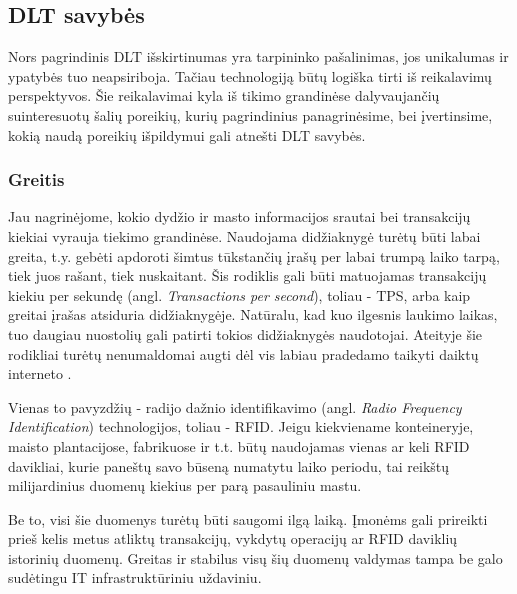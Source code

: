 
\subsection{DLT savybės}

Nors pagrindinis DLT išskirtinumas yra tarpininko pašalinimas, jos unikalumas ir ypatybės tuo neapsiriboja. Tačiau technologiją būtų logiška tirti iš reikalavimų perspektyvos. Šie reikalavimai kyla iš tikimo grandinėse dalyvaujančių suinteresuotų šalių poreikių, kurių pagrindinius panagrinėsime, bei įvertinsime, kokią naudą poreikių išpildymui gali atnešti DLT savybės.




\subsubsection{Greitis}

Jau nagrinėjome, kokio dydžio ir masto informacijos srautai bei transakcijų kiekiai vyrauja tiekimo grandinėse. Naudojama didžiaknygė turėtų būti labai greita, t.y. gebėti apdoroti šimtus tūkstančių įrašų per labai trumpą laiko tarpą, tiek juos rašant, tiek nuskaitant. Šis rodiklis gali būti matuojamas transakcijų kiekiu per sekundę (angl. \textit{Transactions per second}), toliau - TPS, arba kaip greitai įrašas atsiduria didžiaknygėje. Natūralu, kad kuo ilgesnis laukimo laikas, tuo daugiau nuostolių gali patirti tokios didžiaknygės naudotojai. Ateityje šie rodikliai turėtų nenumaldomai augti dėl vis labiau pradedamo taikyti daiktų interneto \cite{kaur2018edge}. 

Vienas to pavyzdžių - radijo dažnio identifikavimo (angl. \textit{Radio Frequency Identification}) technologijos, toliau - RFID. Jeigu kiekviename konteineryje, maisto plantacijose, fabrikuose ir t.t. būtų naudojamas vienas ar keli RFID davikliai, kurie paneštų savo būseną numatytu laiko periodu, tai reikštų milijardinius duomenų kiekius per parą pasauliniu mastu.

Be to, visi šie duomenys turėtų būti saugomi ilgą laiką. Įmonėms gali prireikti prieš kelis metus atliktų transakcijų, vykdytų operacijų ar RFID daviklių istorinių duomenų. Greitas ir stabilus visų šių duomenų valdymas tampa be galo sudėtingu IT infrastruktūriniu uždaviniu.

